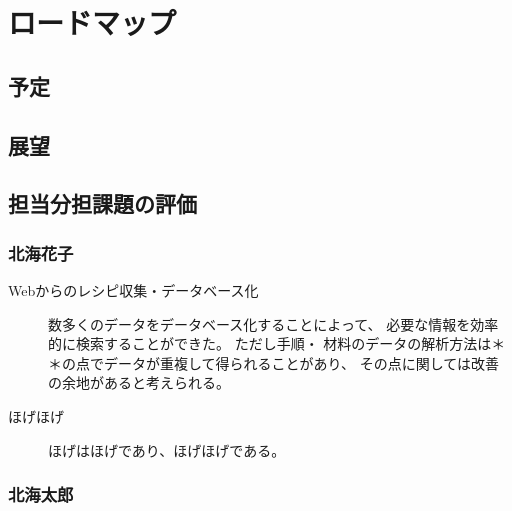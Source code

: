 \chapter{ロードマップ}

\section{予定}



\section{展望}





\section{担当分担課題の評価}

\subsection{北海花子}
\begin{description}
 \item[Webからのレシピ収集・データベース化] 
  数多くのデータをデータベース化することによって、
  必要な情報を効率的に検索することができた。 ただし手順・
  材料のデータの解析方法は＊＊の点でデータが重複して得られることがあり、
  その点に関しては改善の余地があると考えられる。 
 \item[ほげほげ]
  ほげはほげであり、ほげほげである。
\end{description}


\subsection{北海太郎}

